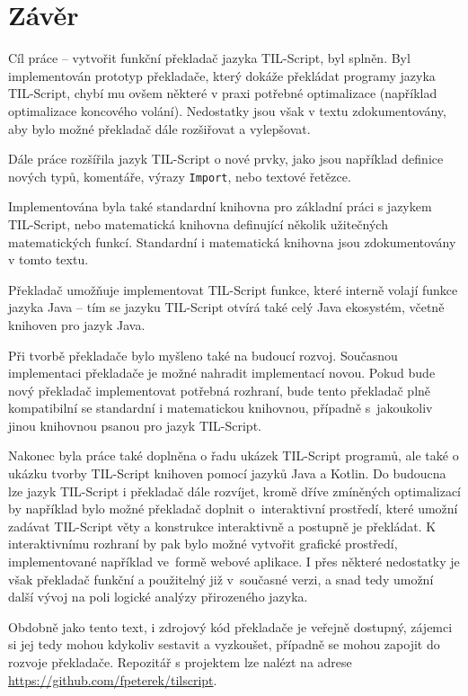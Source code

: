 \chapter{Závěr}

Cíl práce -- vytvořit funkční překladač jazyka TIL-Script, byl splněn. Byl implementován prototyp
překladače, který dokáže překládat programy jazyka TIL-Script, chybí mu ovšem některé v praxi
potřebné optimalizace (například optimalizace koncového volání). Nedostatky jsou však v textu
zdokumentovány, aby bylo možné překladač dále rozšiřovat a vylepšovat.

Dále práce rozšířila jazyk TIL-Script o nové prvky, jako jsou například definice nových typů,
komentáře, výrazy \lstinline{Import}, nebo textové řetězce.

Implementována byla také standardní knihovna pro základní práci s jazykem TIL-Script, nebo
matematická knihovna definující několik užitečných matematických funkcí. Standardní i matematická
knihovna jsou zdokumentovány v tomto textu.

Překladač umožňuje implementovat TIL-Script funkce, které interně volají funkce jazyka Java -- tím
se jazyku TIL-Script otvírá také celý Java ekosystém, včetně knihoven pro jazyk Java.

Při tvorbě překladače bylo myšleno také na budoucí rozvoj. Současnou implementaci překladače je
možné nahradit implementací novou. Pokud bude nový překladač implementovat potřebná rozhraní, bude
tento překladač plně kompatibilní se standardní i matematickou knihovnou, případně s~jakoukoliv
jinou knihovnou psanou pro jazyk TIL-Script.

Nakonec byla práce také doplněna o řadu ukázek TIL-Script programů, ale také o ukázku tvorby
TIL-Script knihoven pomocí jazyků Java a Kotlin. Do budoucna lze jazyk TIL-Script i překladač dále
rozvíjet, kromě dříve zmíněných optimalizací by například bylo možné překladač doplnit
o~interaktivní prostředí, které umožní zadávat TIL-Script věty a konstrukce interaktivně a postupně
je překládat. K interaktivnímu rozhraní by pak bylo možné vytvořit grafické prostředí,
implementované například ve~formě webové aplikace. I přes některé nedostatky je však překladač
funkční a použitelný již v~současné verzi, a snad tedy umožní další vývoj na poli logické analýzy
přirozeného jazyka.

Obdobně jako tento text, i zdrojový kód překladače je veřejně dostupný, zájemci si jej tedy mohou
kdykoliv sestavit a vyzkoušet, případně se mohou zapojit do rozvoje překladače. Repozitář
s projektem lze nalézt na adrese \url{https://github.com/fpeterek/tilscript}.

\endinput
